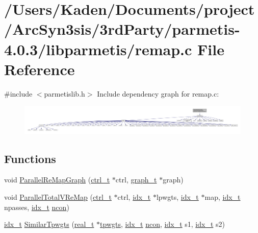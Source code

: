 \hypertarget{a00395}{}\section{/\+Users/\+Kaden/\+Documents/project/\+Arc\+Syn3sis/3rd\+Party/parmetis-\/4.0.3/libparmetis/remap.c File Reference}
\label{a00395}
{\ttfamily \#include $<$parmetislib.\+h$>$}\newline
Include dependency graph for remap.\+c\+:\nopagebreak
\begin{figure}[H]
\begin{center}
\leavevmode
\includegraphics[width=350pt]{a00396}
\end{center}
\end{figure}
\subsection*{Functions}
\begin{DoxyCompactItemize}
\item 
void \hyperlink{a00395_a88aeef4a2abd395ed5ef87820593d791}{Parallel\+Re\+Map\+Graph} (\hyperlink{a00742}{ctrl\+\_\+t} $\ast$ctrl, \hyperlink{a00734}{graph\+\_\+t} $\ast$graph)
\item 
void \hyperlink{a00395_a2ee84cc2bb186c63e443c5b0dee580d1}{Parallel\+Total\+V\+Re\+Map} (\hyperlink{a00742}{ctrl\+\_\+t} $\ast$ctrl, \hyperlink{a00876_aaa5262be3e700770163401acb0150f52}{idx\+\_\+t} $\ast$lpwgts, \hyperlink{a00876_aaa5262be3e700770163401acb0150f52}{idx\+\_\+t} $\ast$map, \hyperlink{a00876_aaa5262be3e700770163401acb0150f52}{idx\+\_\+t} npasses, \hyperlink{a00876_aaa5262be3e700770163401acb0150f52}{idx\+\_\+t} \hyperlink{a00879_ac1dd31740e8f97fb57dc917ded30253f}{ncon})
\item 
\hyperlink{a00876_aaa5262be3e700770163401acb0150f52}{idx\+\_\+t} \hyperlink{a00395_a356dd9e7483362d83646d132426d89fe}{Similar\+Tpwgts} (\hyperlink{a00876_a1924a4f6907cc3833213aba1f07fcbe9}{real\+\_\+t} $\ast$\hyperlink{a00879_aa91786cd8ea996ec49ed5b382eb7fc2f}{tpwgts}, \hyperlink{a00876_aaa5262be3e700770163401acb0150f52}{idx\+\_\+t} \hyperlink{a00879_ac1dd31740e8f97fb57dc917ded30253f}{ncon}, \hyperlink{a00876_aaa5262be3e700770163401acb0150f52}{idx\+\_\+t} s1, \hyperlink{a00876_aaa5262be3e700770163401acb0150f52}{idx\+\_\+t} s2)
\end{DoxyCompactItemize}


